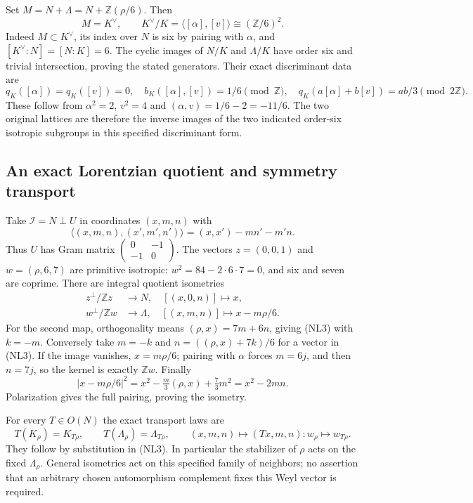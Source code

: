 Set $M=N+\Lambda=N+\mathbb Z(\rho/6)$.
Then
\[
 M=K^\vee,\qquad K^\vee/K=
    \langle[\alpha],[v]\rangle\cong(\mathbb Z/6)^2.
 \tag{NL15}
\]
Indeed $M\subset K^\vee$, its index over $N$ is six by pairing
with $\alpha$, and $[K^\vee:N]=[N:K]=6$.
The cyclic images of $N/K$ and $\Lambda/K$ have order six and
trivial intersection, proving the stated generators.
Their exact discriminant data are
\[
 q_K([\alpha])=q_K([v])=0,\quad
 b_K([\alpha],[v])=1/6\pmod{\mathbb Z},\quad
 q_K(a[\alpha]+b[v])=ab/3\pmod{2\mathbb Z}.
 \tag{NL16}
\]
These follow from $\alpha^2=2$, $v^2=4$ and
$(\alpha,v)=1/6-2=-11/6$.
The two original lattices are therefore the inverse images
of the two indicated order-six isotropic subgroups in this
specified discriminant form.

\subsection{An exact Lorentzian quotient and symmetry transport}

Take $\mathcal I=N\perp U$ in coordinates $(x,m,n)$ with
\[
 \langle(x,m,n),(x',m',n')\rangle
 =(x,x')-mn'-m'n .
\]
Thus $U$ has Gram matrix
$\left(\begin{smallmatrix}0&-1\\-1&0\end{smallmatrix}\right)$.
The vectors $z=(0,0,1)$ and $w=(\rho,6,7)$ are primitive
isotropic: $w^2=84-2\cdot6\cdot7=0$, and six and seven are
coprime. There are integral quotient isometries
\[
 \begin{split}
 z^\perp/\mathbb Zz&\longrightarrow N,\quad[(x,0,n)]\mapsto x,\\
 w^\perp/\mathbb Zw&\longrightarrow\Lambda,\quad
                                  [(x,m,n)]\mapsto x-m\rho/6.
 \end{split}
 \tag{NL17}
\]
For the second map, orthogonality means $(\rho,x)=7m+6n$,
giving (NL3) with $k=-m$. Conversely take $m=-k$ and
$n=((\rho,x)+7k)/6$ for a vector in (NL3).
If the image vanishes, $x=m\rho/6$; pairing with $\alpha$
forces $m=6j$, and then $n=7j$, so the kernel is exactly
$\mathbb Zw$. Finally
\[
 |x-m\rho/6|^2
 =x^2-\tfrac m3(\rho,x)+\tfrac73m^2=x^2-2mn.
\]
Polarization gives the full pairing, proving the isometry.

For every $T\in O(N)$ the exact transport laws are
\[
 T(K_\rho)=K_{T\rho},\qquad
 T(\Lambda_\rho)=\Lambda_{T\rho},\qquad
 (x,m,n)\mapsto(Tx,m,n):w_\rho\mapsto w_{T\rho}.
 \tag{NL18}
\]
They follow by substitution in (NL3).
In particular the stabilizer of $\rho$ acts on the fixed
$\Lambda_\rho$. General isometries act on this specified
family of neighbors; no assertion that an arbitrary chosen
automorphism complement fixes this Weyl vector is required.


